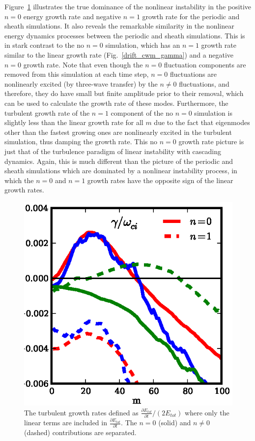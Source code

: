 \documentclass[showpacs,preprintnumbers,amsmath,amssymb,superscriptaddress,aip]{revtex4-1}
\newcommand{\pdiff}[2]{\frac{\partial#1}{\partial#2}}
\begin{document}
Figure~\ref{nl_vs_lin_gamma} illustrates the true dominance of the nonlinear instability in the positive $n=0$ energy growth rate and negative $n=1$ growth rate for the periodic and sheath simulations. 
It also reveals the remarkable similarity in the nonlinear energy dynamics processes between the periodic and sheath simulations. This is in stark contrast to the no $n=0$ simulation, which has an $n=1$
growth rate similar to the linear growth rate (Fig.~\ref{drift_cwm_gamma}) and a negative $n=0$ growth rate. Note that even though the $n=0$ fluctuation components are removed from this simulation at each time
step, $n=0$ fluctuations are nonlinearly excited (by three-wave transfer) by the $n \ne 0$ fluctuations, and therefore, they do have small but finite amplitude prior to their removal, which can be used to
calculate the growth rate of these modes. Furthermore, the turbulent growth rate of the $n=1$ component of the no $n=0$ simulation is
slightly less than the linear growth rate for all $m$ due to the fact that eigenmodes other than the fastest growing ones are nonlinearly excited in the turbulent simulation, thus damping the growth rate.
This no $n=0$ growth rate picture is just that of the turbulence paradigm of linear instability with cascading dynamics. Again, this is much different than the picture of the periodic and sheath simulations
which are dominated by a nonlinear instability process, in which the $n=0$ and $n=1$ growth rates have the opposite sign of the linear growth rates.


\begin{figure}[!htbp]
\includegraphics[]{lin_vs_nl_gamma}
\hfil
\caption{ The turbulent growth rates defined as $\pdiff{E_{tot}}{t}/(2 E_{tot})$ where only the linear terms are included in $\pdiff{E_{tot}}{t}$. The $n=0$ (solid) and $n \ne 0$ (dashed) 
contributions are separated.}
\label{nl_vs_lin_gamma}
\end{figure}
\end{document}
